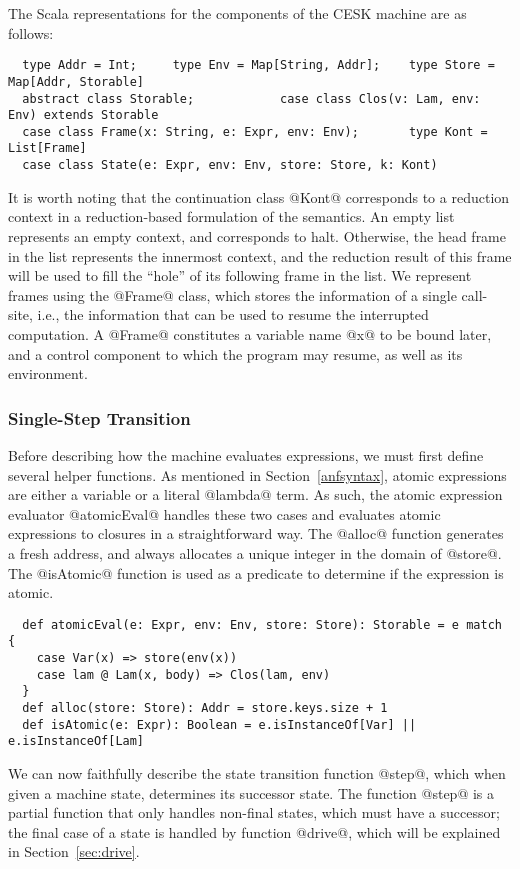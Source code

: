 \documentclass[acmsmall, screen]{acmart}\settopmatter{}
\begin{document}
The Scala representations for the components of the CESK machine are as follows:

\begin{lstlisting}
  type Addr = Int;     type Env = Map[String, Addr];    type Store = Map[Addr, Storable]
  abstract class Storable;            case class Clos(v: Lam, env: Env) extends Storable
  case class Frame(x: String, e: Expr, env: Env);       type Kont = List[Frame]
  case class State(e: Expr, env: Env, store: Store, k: Kont)
\end{lstlisting}

It is worth noting that the continuation class @Kont@ corresponds to a reduction
context in a reduction-based formulation of the semantics.
An empty list represents an empty context, and corresponds to halt. Otherwise, the head
frame in the list represents the innermost context, and the reduction result of this
frame will be used to fill the ``hole'' of its following frame in the list.
We represent frames using the @Frame@ class, which stores the information of a single
call-site, i.e., the information that can be used to resume the interrupted computation.
A @Frame@ constitutes a variable name @x@ to be bound later, and a control component
to which the program may resume, as well as its environment.

\subsubsection{Single-Step Transition}
Before describing how the machine evaluates expressions, we must first define several helper
functions. As mentioned in Section~\ref{anfsyntax}, atomic expressions are either a variable
or a literal @lambda@ term. As such, the atomic expression evaluator @atomicEval@ handles
these two cases and evaluates atomic expressions to closures in a straightforward way.
The @alloc@ function generates a fresh address, and always allocates a unique integer
in the domain of @store@.
The @isAtomic@ function is used as a predicate to determine if the expression is atomic.

\begin{lstlisting}
  def atomicEval(e: Expr, env: Env, store: Store): Storable = e match {
    case Var(x) => store(env(x))
    case lam @ Lam(x, body) => Clos(lam, env)
  }
  def alloc(store: Store): Addr = store.keys.size + 1
  def isAtomic(e: Expr): Boolean = e.isInstanceOf[Var] || e.isInstanceOf[Lam]
\end{lstlisting}

We can now faithfully describe the state transition function @step@,
which when given a machine state, determines its successor state.
The function @step@ is a partial function that only handles non-final states,
which must have a successor; the final case of a state is handled by function
@drive@, which will be explained in Section~\ref{sec:drive}.
\end{document}
